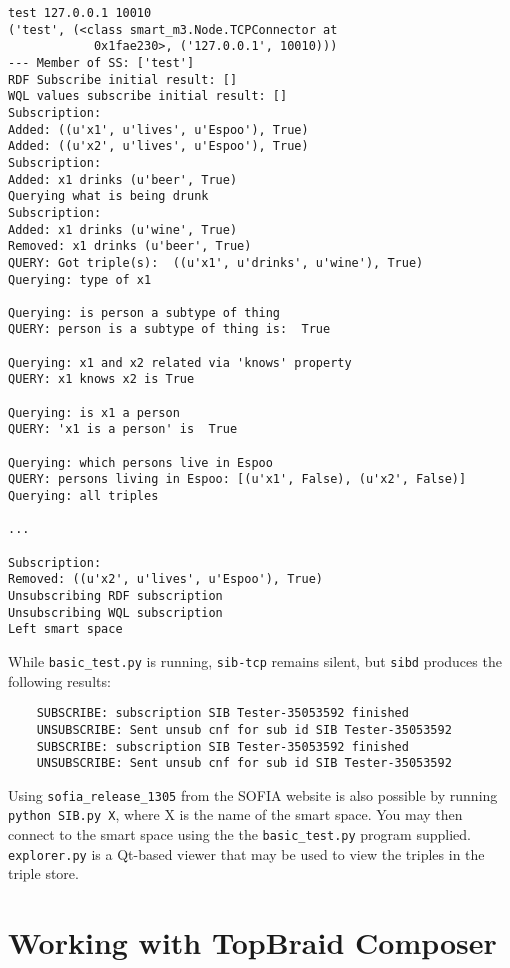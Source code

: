 \begin{verbatim}
test 127.0.0.1 10010
('test', (<class smart_m3.Node.TCPConnector at 
			0x1fae230>, ('127.0.0.1', 10010)))
--- Member of SS: ['test']
RDF Subscribe initial result: []
WQL values subscribe initial result: []
Subscription:
Added: ((u'x1', u'lives', u'Espoo'), True)
Added: ((u'x2', u'lives', u'Espoo'), True)
Subscription:
Added: x1 drinks (u'beer', True)
Querying what is being drunk
Subscription:
Added: x1 drinks (u'wine', True)
Removed: x1 drinks (u'beer', True)
QUERY: Got triple(s):  ((u'x1', u'drinks', u'wine'), True)
Querying: type of x1

Querying: is person a subtype of thing
QUERY: person is a subtype of thing is:  True

Querying: x1 and x2 related via 'knows' property
QUERY: x1 knows x2 is True

Querying: is x1 a person
QUERY: 'x1 is a person' is  True

Querying: which persons live in Espoo
QUERY: persons living in Espoo: [(u'x1', False), (u'x2', False)]
Querying: all triples

...

Subscription:
Removed: ((u'x2', u'lives', u'Espoo'), True)
Unsubscribing RDF subscription
Unsubscribing WQL subscription
Left smart space
\end{verbatim}

While \texttt{basic\_test.py} is running, \texttt{sib-tcp} remains silent, but \texttt{sibd} produces the following results:

\begin{verbatim}
	SUBSCRIBE: subscription SIB Tester-35053592 finished
	UNSUBSCRIBE: Sent unsub cnf for sub id SIB Tester-35053592
	SUBSCRIBE: subscription SIB Tester-35053592 finished
	UNSUBSCRIBE: Sent unsub cnf for sub id SIB Tester-35053592
\end{verbatim}

Using \texttt{sofia\_release\_1305} from the SOFIA website is also possible by running \verb|python SIB.py X|, where X is the name of the smart space. You may then connect to the smart space using the the \texttt{basic\_test.py} program supplied.
\texttt{explorer.py} is a Qt-based viewer that may be used to view the triples in the triple store.


\section{Working with TopBraid Composer}

